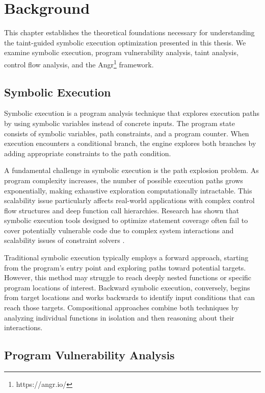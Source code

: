 \chapter{Background}

This chapter establishes the theoretical foundations necessary for understanding the taint-guided symbolic execution optimization presented in this thesis. We examine symbolic execution, program vulnerability analysis, taint analysis, control flow analysis, and the Angr\footnote{https://angr.io/} framework.

\section{Symbolic Execution}

Symbolic execution is a program analysis technique that explores execution paths by using symbolic variables instead of concrete inputs. The program state consists of symbolic variables, path constraints, and a program counter. When execution encounters a conditional branch, the engine explores both branches by adding appropriate constraints to the path condition.

A fundamental challenge in symbolic execution is the path explosion problem. As program complexity increases, the number of possible execution paths grows exponentially, making exhaustive exploration computationally intractable. This scalability issue particularly affects real-world applications with complex control flow structures and deep function call hierarchies. Research has shown that symbolic execution tools designed to optimize statement coverage often fail to cover potentially vulnerable code due to complex system interactions and scalability issues of constraint solvers \cite{schwartz_all_2010}.

Traditional symbolic execution typically employs a forward approach, starting from the program's entry point and exploring paths toward potential targets. However, this method may struggle to reach deeply nested functions or specific program locations of interest. Backward symbolic execution, conversely, begins from target locations and works backwards to identify input conditions that can reach those targets. Compositional approaches combine both techniques by analyzing individual functions in isolation and then reasoning about their interactions.

\section{Program Vulnerability Analysis}

